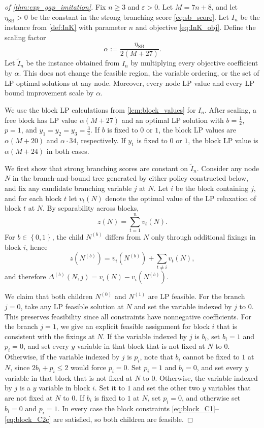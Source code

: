 \documentclass[smallextended,envcountsect]{svjour3} %
\newcommand{\set}[1]{\left\{#1\right\}}
\newcommand{\0}{\mathbf{0}}
\newcommand{\1}{\mathbf{1}} %
\begin{document}
\begin{proof}[of \cref{thm:exp_gap_imitation}]
	Fix $n\ge 3$ and $\varepsilon>0$.
	Let $M=7n+8$, and let $\eta_{\mathrm{SB}}>0$ be the constant in the strong branching score \eqref{eq:sb_score}.
	Let $I_n$ be the instance from \cref{def:InK} with parameter $n$ and objective \eqref{eq:InK_obj}.
	Define the scaling factor
	\[
		\alpha:=\frac{\eta_{\mathrm{SB}}}{2(M+27)}.
	\]
		Let $\widetilde I_n$ be the instance obtained from $I_n$ by multiplying every objective coefficient by $\alpha$.
		This does not change the feasible region, the variable ordering, or the set of LP optimal solutions at any node.
		Moreover, every node LP value and every LP bound improvement scale by $\alpha$.

	We use the block LP calculations from \cref{lem:block_values} for $I_n$.
	After scaling, a free block has LP value $\alpha(M+27)$ and an optimal LP solution with $b=\tfrac12$, $p=1$, and $y_1=y_2=y_3=\tfrac34$.
	If $b$ is fixed to $0$ or $1$, the block LP values are $\alpha(M+20)$ and $\alpha\cdot 34$, respectively.
		If $y_1$ is fixed to $0$ or $1$, the block LP value is $\alpha(M+24)$ in both cases.

		We first show that strong branching scores are constant on $\widetilde I_n$.
		Consider any node $N$ in the branch-and-bound tree generated by either policy constructed below, and fix any candidate branching variable $j$ at $N$.
		Let $i$ be the block containing $j$, and for each block $t$ let $v_t(N)$ denote the optimal value of the LP relaxation of block $t$ at $N$.
		By separability across blocks,
		\[
			z(N)=\sum_{t=1}^n v_t(N).
		\]
		For $b\in\set{0,1}$, the child $N^{(b)}$ differs from $N$ only through additional fixings in block $i$, hence
		\[
			z(N^{(b)})=v_i(N^{(b)})+\sum_{t\neq i} v_t(N),
		\]
		and therefore $\Delta^{(b)}(N,j)=v_i(N)-v_i(N^{(b)})$.
		
		We claim that both children $N^{(0)}$ and $N^{(1)}$ are LP feasible.
		For the branch $j=0$, take any LP feasible solution at $N$ and set the variable indexed by $j$ to $0$.
		This preserves feasibility since all constraints have nonnegative coefficients.
		For the branch $j=1$, we give an explicit feasible assignment for block $i$ that is consistent with the fixings at $N$.
		If the variable indexed by $j$ is $b_i$, set $b_i=1$ and $p_i=0$, and set every $y$ variable in that block that is not fixed at $N$ to $0$.
		Otherwise, if the variable indexed by $j$ is $p_i$, note that $b_i$ cannot be fixed to $1$ at $N$, since $2b_i+p_i\le 2$ would force $p_i=0$.
		Set $p_i=1$ and $b_i=0$, and set every $y$ variable in that block that is not fixed at $N$ to $0$.
		Otherwise, the variable indexed by $j$ is a $y$ variable in block $i$.
		Set it to $1$ and set the other two $y$ variables that are not fixed at $N$ to $0$.
		If $b_i$ is fixed to $1$ at $N$, set $p_i=0$, and otherwise set $b_i=0$ and $p_i=1$.
		In every case the block constraints \eqref{eq:block_C1}--\eqref{eq:block_C2c} are satisfied, so both children are feasible.
		

\end{proof}
\end{document}
